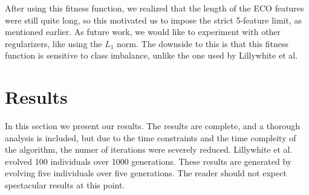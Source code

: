 \documentclass[conference]{IEEEtran}
\begin{document}
After using this fitness function, we realized that the length of the ECO features were still quite long, so this motivated us to impose the strict 5-feature limit, as mentioned earlier. As future work, we would like to experiment with other regularizers, like using the $L_1$ norm. The downside to this is that this fitness function is sensitive to class imbalance, unlike the one used by Lillywhite et al. 

\section{Results}
In this section we present our results. The results are complete, and a thorough analysis is included, but due to the time constraints and the time compleity of the algorithm, the numer of iterations were severely reduced. Lillywhite et al. evolved 100 individuals over 1000 generations. These results are generated by evolving five individuals over five generations. The reader should not expect spectacular results at this point.
\end{document}
